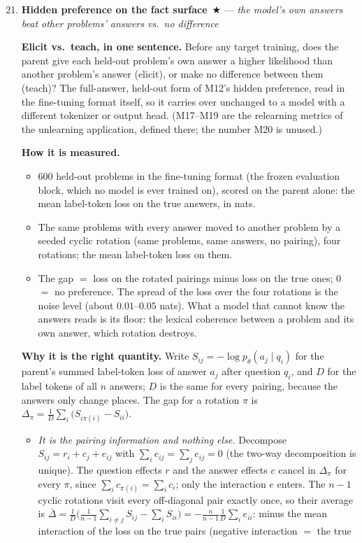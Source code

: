\documentclass[11pt]{article}
\newcommand{\what}[1]{\par\noindent\textbf{Elicit vs.\ teach, in one sentence.} #1}
\newcommand{\how}[1]{\par\noindent\textbf{How it is measured.} #1}
\newcommand{\why}[1]{\par\noindent\textbf{Why it is the right quantity.} #1}
\newenvironment{steps}{\begin{itemize}[nosep,leftmargin=1.2em,topsep=2pt]}{\end{itemize}}
\newcommand{\metricsecp}[2]{\item \textbf{#1}~$\bigstar$ --- \emph{#2}}
\begin{document}
\begin{enumerate}[label=\textbf{M\arabic*}, leftmargin=*, itemsep=1.2em, resume]
\setcounter{enumi}{20}
\metricsecp{Hidden preference on the fact surface}{the model's own answers beat other problems' answers vs.\ no difference}
\what{Before any target training, does the parent give each held-out problem's own answer a higher
likelihood than another problem's answer (elicit), or make no difference between them (teach)?
The full-answer, held-out form of M12's hidden preference, read in the fine-tuning format itself,
so it carries over unchanged to a model with a different tokenizer or output head. (M17--M19 are
the relearning metrics of the unlearning application, defined there; the number M20 is unused.)}
\how{
\begin{steps}
\item 600 held-out problems in the fine-tuning format (the frozen evaluation block, which no model
is ever trained on), scored on the parent alone: the mean label-token loss on the true answers, in
nats.
\item The same problems with every answer moved to another problem by a seeded cyclic rotation
(same problems, same answers, no pairing), four rotations; the mean label-token loss on them.
\item The gap $=$ loss on the rotated pairings minus loss on the true ones; $0$ $=$ no preference.
The spread of the loss over the four rotations is the noise level (about $0.01$--$0.05$ nats).
What a model that cannot know the answers reads is its floor: the lexical coherence between a
problem and its own answer, which rotation destroys.
\end{steps}}
\why{Write $S_{ij}=-\log p_\theta(a_j\mid q_i)$ for the parent's summed label-token loss of answer
$a_j$ after question $q_i$, and $D$ for the label tokens of all $n$ answers; $D$ is the same for
every pairing, because the answers only change places. The gap for a rotation $\pi$ is
$\Delta_\pi=\frac1D\sum_i\big(S_{i\pi(i)}-S_{ii}\big)$.
\begin{steps}
\item \emph{It is the pairing information and nothing else.} Decompose
$S_{ij}=r_i+c_j+e_{ij}$ with $\sum_ie_{ij}=\sum_je_{ij}=0$ (the two-way decomposition is
unique). The question effects $r$ and the answer effects $c$ cancel in $\Delta_\pi$ for every
$\pi$, since $\sum_ic_{\pi(i)}=\sum_ic_i$; only the interaction $e$ enters. The $n-1$ cyclic
rotations visit every off-diagonal pair exactly once, so their average is
$\bar\Delta=\frac1D\big(\frac1{n-1}\sum_{i\ne j}S_{ij}-\sum_iS_{ii}\big)=-\frac{n}{n-1}\frac1D\sum_ie_{ii}$:
minus the mean interaction of the loss on the true pairs (negative interaction $=$ the true

\end{steps}}
\end{enumerate}
\end{document}
